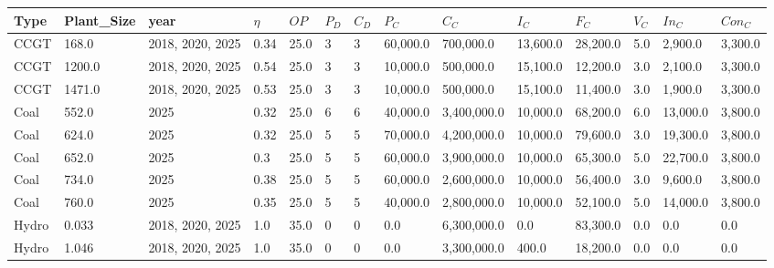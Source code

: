 \documentclass[sigconf]{acmart}
\begin{document}
\begin{table*}[]
	\begin{tabularx}{\linewidth}{|p{}|l|x|l|l|l|l|l|l|l|l|l|l|l|}
\hline
Type                          & Plant\_Size & year             & $\eta$ & $OP$ & $P_D$ & $C_D$ & $P_C$     & $C_C$       & $I_C$     & $F_C$    & $V_C$ & $In_C$   & $Con_C$   \\ \hline
CCGT                          & 168.0       & 2018, 2020, 2025 & 0.34   & 25.0 & 3     & 3     & 60,000.0  & 700,000.0   & 13,600.0  & 28,200.0 & 5.0   & 2,900.0  & 3,300.0   \\ \hline
CCGT                          & 1200.0      & 2018, 2020, 2025 & 0.54   & 25.0 & 3     & 3     & 10,000.0  & 500,000.0   & 15,100.0  & 12,200.0 & 3.0   & 2,100.0  & 3,300.0   \\ \hline
CCGT                          & 1471.0      & 2018, 2020, 2025 & 0.53   & 25.0 & 3     & 3     & 10,000.0  & 500,000.0   & 15,100.0  & 11,400.0 & 3.0   & 1,900.0  & 3,300.0   \\ \hline
Coal                          & 552.0       & 2025             & 0.32   & 25.0 & 6     & 6     & 40,000.0  & 3,400,000.0 & 10,000.0  & 68,200.0 & 6.0   & 13,000.0 & 3,800.0   \\ \hline
Coal                          & 624.0       & 2025             & 0.32   & 25.0 & 5     & 5     & 70,000.0  & 4,200,000.0 & 10,000.0  & 79,600.0 & 3.0   & 19,300.0 & 3,800.0   \\ \hline
Coal                          & 652.0       & 2025             & 0.3    & 25.0 & 5     & 5     & 60,000.0  & 3,900,000.0 & 10,000.0  & 65,300.0 & 5.0   & 22,700.0 & 3,800.0   \\ \hline
Coal                          & 734.0       & 2025             & 0.38   & 25.0 & 5     & 5     & 60,000.0  & 2,600,000.0 & 10,000.0  & 56,400.0 & 3.0   & 9,600.0  & 3,800.0   \\ \hline
Coal                          & 760.0       & 2025             & 0.35   & 25.0 & 5     & 5     & 40,000.0  & 2,800,000.0 & 10,000.0  & 52,100.0 & 5.0   & 14,000.0 & 3,800.0   \\ \hline
Hydro                         & 0.033       & 2018, 2020, 2025 & 1.0    & 35.0 & 0     & 0     & 0.0       & 6,300,000.0 & 0.0       & 83,300.0 & 0.0   & 0.0      & 0.0       \\ \hline
Hydro                         & 1.046       & 2018, 2020, 2025 & 1.0    & 35.0 & 0     & 0     & 0.0       & 3,300,000.0 & 400.0     & 18,200.0 & 0.0   & 0.0      & 0.0       \\ \hline

\end{tabularx}
\end{table*}
\end{document}
